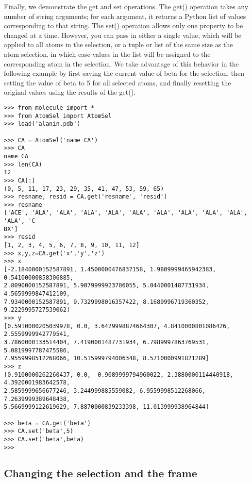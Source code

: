 Finally, we demonstrate the get and set operations.  The get() operation takes
any number of string arguments; for each argument, it returns a Python
list of values corresponding to that string.  The set() operation allows only
one property to be changed at a time.  However, you can pass in either a 
single value, which will be applied to all atoms in the selection, or a 
tuple or list of the same size as the atom selection, in which case values
in the list will be assigned to the corresponding atom in the selection.
We take advantage of this behavior in the following example by first saving
the current value of beta for the selection, then setting the value of beta
to 5 for all selected atoms, and finally resetting the original values using
the results of the get(). 

\begin{verbatim}
>>> from molecule import *
>>> from AtomSel import AtomSel
>>> load('alanin.pdb')

>>> CA = AtomSel('name CA')
>>> CA                  
name CA
>>> len(CA)
12
>>> CA[:]
(0, 5, 11, 17, 23, 29, 35, 41, 47, 53, 59, 65)
>>> resname, resid = CA.get('resname', 'resid')
>>> resname
['ACE', 'ALA', 'ALA', 'ALA', 'ALA', 'ALA', 'ALA', 'ALA', 'ALA', 'ALA', 'ALA', 'C
BX']
>>> resid
[1, 2, 3, 4, 5, 6, 7, 8, 9, 10, 11, 12]
>>> x,y,z=CA.get('x','y','z')
>>> x
[-2.1840000152587891, 1.4500000476837158, 1.9809999465942383, 0.54100000858306885, 
2.8090000152587891, 5.9079999923706055, 5.0440001487731934, 4.5659999847412109,
7.9340000152587891, 9.7329998016357422, 8.1689996719360352, 9.2229995727539062]
>>> y
[0.5910000205039978, 0.0, 3.6429998874664307, 4.8410000801086426, 2.5559999942779541, 
3.7860000133514404, 7.4190001487731934, 6.7989997863769531, 5.0819997787475586, 
7.9559998512268066, 10.515999794006348, 8.5710000991821289]
>>> z
[0.9100000262260437, 0.0, -0.9089999794960022, 2.3880000114440918, 4.3920001983642578, 
2.5859999656677246, 3.244999885559082, 6.9559998512268066, 7.2639999389648438, 
5.5669999122619629, 7.8870000839233398, 11.013999938964844]

>>> beta = CA.get('beta')
>>> CA.set('beta',5)
>>> CA.set('beta',beta)
>>> 

\end{verbatim}


\subsection{Changing the selection and the frame}


